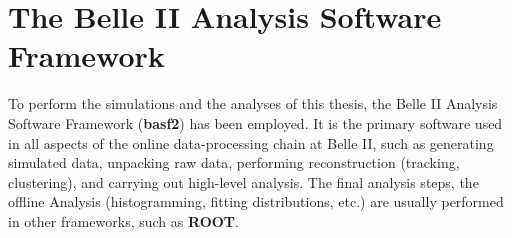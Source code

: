 \section{The Belle II Analysis Software Framework}
To perform the simulations and the analyses of this thesis, the Belle II Analysis Software Framework (\textbf{basf2}) has been employed. It is the primary software used in all aspects of the online data-processing chain at Belle II, such as generating simulated data, unpacking raw data, performing reconstruction (tracking, clustering), and carrying out high-level analysis. The final analysis steps, the offline Analysis (histogramming, fitting distributions, etc.) are usually performed in other frameworks, such as \textbf{ROOT}.
